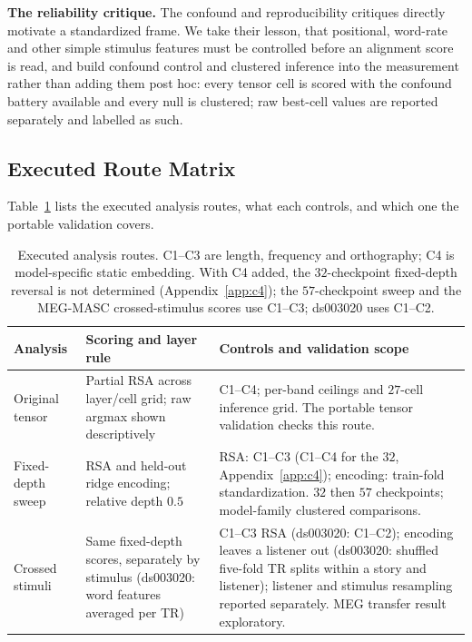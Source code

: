 \documentclass{article}
\begin{document}
\textbf{The reliability critique.} The confound and reproducibility critiques
\citep{feghhi2026spurious, lai2025illusions} directly motivate a standardized frame. We take their
lesson, that positional, word-rate and other simple stimulus features must be controlled before an
alignment score is read, and build confound control and clustered inference into the measurement
rather than adding them post hoc: every tensor cell is scored with the confound battery available
and every null is clustered; raw best-cell values are reported separately and labelled as such.


\subsection{Executed Route Matrix}
Table~\ref{tab:protocols} lists the executed analysis routes, what each controls, and which one the
portable validation covers.
\begin{table}[t]
\centering\small
\begin{tabular}{@{}p{2.6cm}p{3.7cm}p{5.0cm}@{}}
\toprule
Analysis & Scoring and layer rule & Controls and validation scope \\
\midrule
Original tensor & Partial RSA across layer/cell grid; raw argmax shown descriptively & C1--C4; per-band ceilings and $27$-cell inference grid. The portable tensor validation checks this route. \\
Fixed-depth sweep & RSA and held-out ridge encoding; relative depth $0.5$ & RSA: C1--C3 (C1--C4 for the $32$, Appendix~\ref{app:c4}); encoding: train-fold standardization. $32$ then $57$ checkpoints; model-family clustered comparisons. \\
Crossed stimuli & Same fixed-depth scores, separately by stimulus (ds003020: word features averaged per TR) & C1--C3 RSA (ds003020: C1--C2); encoding leaves a listener out (ds003020: shuffled five-fold TR splits within a story and listener); listener and stimulus resampling reported separately. MEG transfer result exploratory. \\
\bottomrule
\end{tabular}
\caption{Executed analysis routes. C1--C3 are length, frequency and orthography; C4 is model-specific
static embedding. With C4 added, the $32$-checkpoint fixed-depth reversal is not determined
(Appendix~\ref{app:c4}); the $57$-checkpoint sweep and the MEG-MASC crossed-stimulus scores use C1--C3; ds003020 uses C1--C2.}
\label{tab:protocols}
\end{table}
\end{document}
